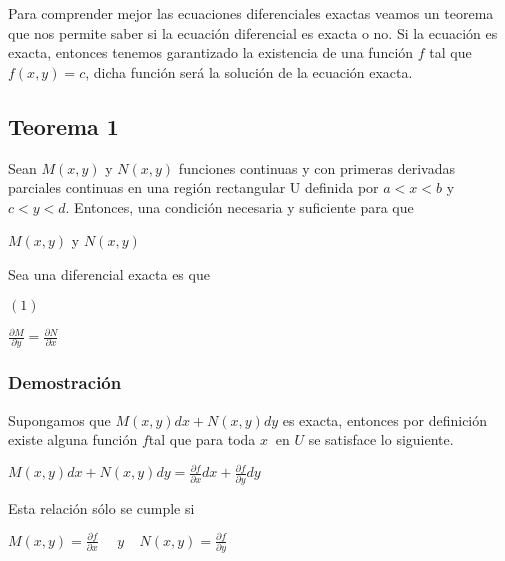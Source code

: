 \documentclass[l etterpaper,11pt]{article}
\begin{document}
Para comprender mejor las ecuaciones diferenciales exactas veamos un teorema que nos permite saber si la ecuación diferencial es exacta o no. Si la ecuación es exacta, entonces tenemos garantizado la existencia de una función $f$ tal que $f\left(x,y\right)=c$, dicha función será la solución de la ecuación exacta.



\subsection{Teorema 1}

 Sean $ M(x,y) $ y $ N(x,y)$ funciones continuas y con primeras derivadas parciales continuas en una región rectangular U definida por $a<x<b $ y $ c<y<d.$ Entonces, una condición necesaria y suficiente para que\\
\begin{center}
$M(x,y)$  y $ N(x,y)$\\
\end{center}


Sea una diferencial exacta es que\\

\begin{flushleft} 
$(1)$
\end{flushleft} 
\begin{center}
$\frac{\partial M}{\partial y}=\frac{\partial N}{\partial x}$ 
\end{center} 



\subsubsection{Demostración}

Supongamos que $ M(x,y)dx+N(x,y)dy $ es exacta, entonces por definición existe alguna función $ f $tal que para toda $ x\ $ en $ U $ se satisface lo siguiente.\\
\begin{center}
$M(x,y)dx+N(x,y)dy=\frac{\partial f}{\partial x}dx+\frac{\partial f}{\partial y}dy$ \\
\end{center}

Esta relación sólo se cumple si\\
\begin{center}
$M\left(x,y\right)=\frac{\partial f}{\partial x}\ \ \ \ \ \ y\ \ \ \ \ N\left(x,y\right)=\frac{\partial f}{\partial y}$\\
\end{center}
\end{document}
